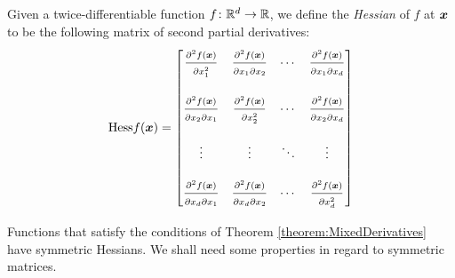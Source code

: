 \begin{definition}[Hessian]\label{def:Hessian}
Given a twice-differentiable function $f\colon \mathbb{R}^d \to \mathbb{R}$, we define the \emph{Hessian} of $f$ at $\boldsymbol{x}$ to be the following matrix of second partial derivatives:
\begin{equation*}
\mathop{\mathrm{Hess}{f}}(\boldsymbol{x}) = \begin{bmatrix}
\frac{\strut\partial^2 f (\boldsymbol{x})}{\strut\partial x_1^2} & \frac{\strut\partial^2 f (\boldsymbol{x})}{\strut\partial x_1 \partial x_2} &\dotsb &\frac{\strut\partial^2 f (\boldsymbol{x})}{\strut\partial x_1 \partial x_d} \\
&&&\\
\frac{\strut\partial^2 f (\boldsymbol{x})}{\strut\partial x_2 \partial x_1} & \frac{\strut\partial^2 f (\boldsymbol{x})}{\strut\partial x_2^2} &\dotsb &\frac{\strut\partial^2 f (\boldsymbol{x})}{\strut\partial x_2 \partial x_d} \\
&&& \\
\vdots & \vdots &\ddots &\vdots \\
&&& \\
\frac{\strut\partial^2 f (\boldsymbol{x})}{\strut\partial x_d \partial x_1} & \frac{\strut\partial^2 f (\boldsymbol{x})}{\strut\partial x_d \partial x_2} &\dotsb &\frac{\strut\partial^2 f (\boldsymbol{x})}{\strut\partial x_d^2}
\end{bmatrix}
\end{equation*}
\end{definition}

Functions that satisfy the conditions of Theorem \ref{theorem:MixedDerivatives} have symmetric Hessians.  We shall need some properties in regard to symmetric matrices.

